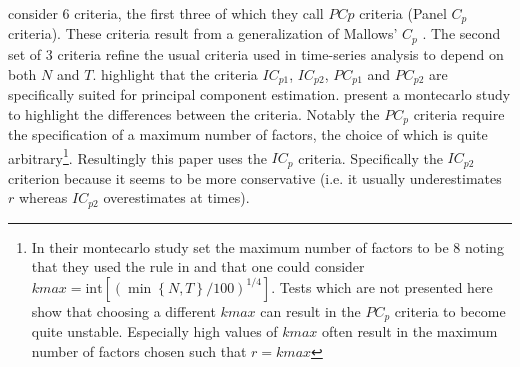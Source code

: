 \documentclass[12pt]{article}
\begin{document}
\citet{bai2002determining} consider $6$ criteria, the first three of which they call $PCp$ criteria (Panel $C_p$ criteria). These criteria result from a generalization of Mallows' $C_p$ \citep{mallows1973some}. The second set of $3$ criteria refine the usual criteria used in time-series analysis to depend on both $N$ and $T$. \citet{bai2002determining} highlight that the criteria $IC_{p1}$, $IC_{p2}$, $PC_{p1}$ and $PC_{p2}$ are specifically suited for principal component estimation. \citet{bai2002determining} present a montecarlo study to highlight the differences between the criteria. Notably the $PC_{p}$ criteria require the specification of a maximum number of factors, the choice of which is quite arbitrary\footnote{In their montecarlo study \citet{bai2002determining} set the maximum number of factors to be $8$ noting that they used the rule in \citet{schwert2002tests} and that one could consider $kmax=\text{int}[(\min\left\{N, T\right\}/100)^{1/4}]$. Tests which are not presented here show that choosing a different $kmax$ can result in the $PC_p$ criteria to become quite unstable. Especially high values of $kmax$ often result in the maximum number of factors chosen such that $r=kmax$}. Resultingly this paper uses the $IC_p$ criteria. Specifically the $IC_{p2}$ criterion because it seems to be more conservative (i.e. it usually underestimates $r$ whereas $IC_{p2}$ overestimates at times). 
\end{document}
